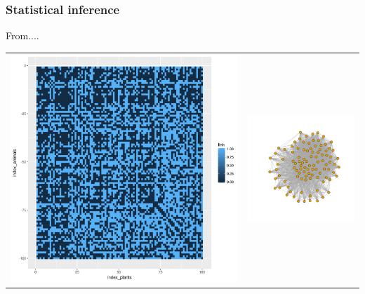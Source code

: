 \documentclass[compress,10pt]{beamer}
\begin{document}

\begin{frame}\frametitle{Statistical inference} 

From.... 

\centering
\begin{tabular}{cc}
 \includegraphics[scale=.2]{plots/sbm/Nested_adja.png}&
 \includegraphics[scale=.2]{plots/sbm/Nested_graphe_without_colors.png}
\end{tabular}
\end{frame}
\end{document}
